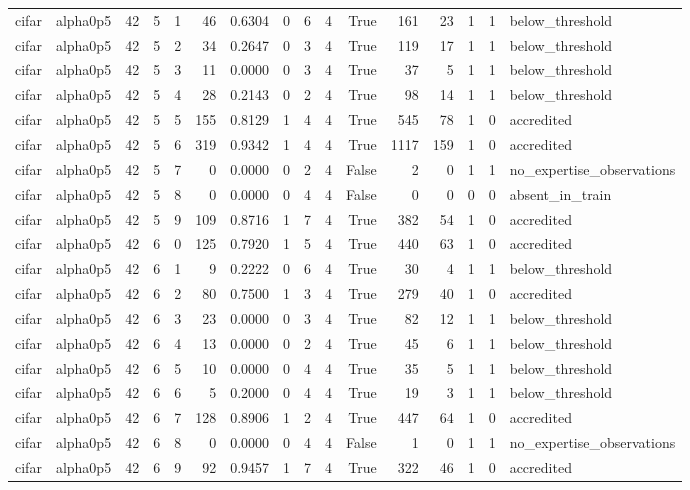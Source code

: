 \begin{tabular}{llrrrrrrrrrrrrrl}
cifar & alpha0p5 & 42 & 5 & 1 & 46 & 0.6304 & 0 & 6 & 4 & True & 161 & 23 & 1 & 1 & below\_threshold \\
cifar & alpha0p5 & 42 & 5 & 2 & 34 & 0.2647 & 0 & 3 & 4 & True & 119 & 17 & 1 & 1 & below\_threshold \\
cifar & alpha0p5 & 42 & 5 & 3 & 11 & 0.0000 & 0 & 3 & 4 & True & 37 & 5 & 1 & 1 & below\_threshold \\
cifar & alpha0p5 & 42 & 5 & 4 & 28 & 0.2143 & 0 & 2 & 4 & True & 98 & 14 & 1 & 1 & below\_threshold \\
cifar & alpha0p5 & 42 & 5 & 5 & 155 & 0.8129 & 1 & 4 & 4 & True & 545 & 78 & 1 & 0 & accredited \\
cifar & alpha0p5 & 42 & 5 & 6 & 319 & 0.9342 & 1 & 4 & 4 & True & 1117 & 159 & 1 & 0 & accredited \\
cifar & alpha0p5 & 42 & 5 & 7 & 0 & 0.0000 & 0 & 2 & 4 & False & 2 & 0 & 1 & 1 & no\_expertise\_observations \\
cifar & alpha0p5 & 42 & 5 & 8 & 0 & 0.0000 & 0 & 4 & 4 & False & 0 & 0 & 0 & 0 & absent\_in\_train \\
cifar & alpha0p5 & 42 & 5 & 9 & 109 & 0.8716 & 1 & 7 & 4 & True & 382 & 54 & 1 & 0 & accredited \\
cifar & alpha0p5 & 42 & 6 & 0 & 125 & 0.7920 & 1 & 5 & 4 & True & 440 & 63 & 1 & 0 & accredited \\
cifar & alpha0p5 & 42 & 6 & 1 & 9 & 0.2222 & 0 & 6 & 4 & True & 30 & 4 & 1 & 1 & below\_threshold \\
cifar & alpha0p5 & 42 & 6 & 2 & 80 & 0.7500 & 1 & 3 & 4 & True & 279 & 40 & 1 & 0 & accredited \\
cifar & alpha0p5 & 42 & 6 & 3 & 23 & 0.0000 & 0 & 3 & 4 & True & 82 & 12 & 1 & 1 & below\_threshold \\
cifar & alpha0p5 & 42 & 6 & 4 & 13 & 0.0000 & 0 & 2 & 4 & True & 45 & 6 & 1 & 1 & below\_threshold \\
cifar & alpha0p5 & 42 & 6 & 5 & 10 & 0.0000 & 0 & 4 & 4 & True & 35 & 5 & 1 & 1 & below\_threshold \\
cifar & alpha0p5 & 42 & 6 & 6 & 5 & 0.2000 & 0 & 4 & 4 & True & 19 & 3 & 1 & 1 & below\_threshold \\
cifar & alpha0p5 & 42 & 6 & 7 & 128 & 0.8906 & 1 & 2 & 4 & True & 447 & 64 & 1 & 0 & accredited \\
cifar & alpha0p5 & 42 & 6 & 8 & 0 & 0.0000 & 0 & 4 & 4 & False & 1 & 0 & 1 & 1 & no\_expertise\_observations \\
cifar & alpha0p5 & 42 & 6 & 9 & 92 & 0.9457 & 1 & 7 & 4 & True & 322 & 46 & 1 & 0 & accredited \\

\end{tabular}
